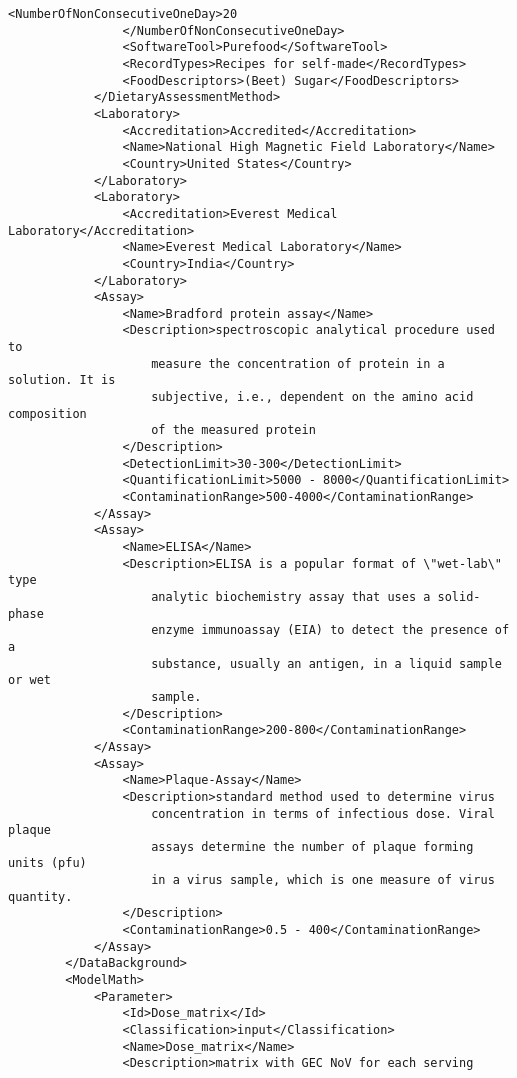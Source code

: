 \begin{lstlisting}[language=RAKIP, caption={Example of GenericModel}]
                <NumberOfNonConsecutiveOneDay>20
                </NumberOfNonConsecutiveOneDay>
                <SoftwareTool>Purefood</SoftwareTool>
                <RecordTypes>Recipes for self-made</RecordTypes>
                <FoodDescriptors>(Beet) Sugar</FoodDescriptors>
            </DietaryAssessmentMethod>
            <Laboratory>
                <Accreditation>Accredited</Accreditation>
                <Name>National High Magnetic Field Laboratory</Name>
                <Country>United States</Country>
            </Laboratory>
            <Laboratory>
                <Accreditation>Everest Medical Laboratory</Accreditation>
                <Name>Everest Medical Laboratory</Name>
                <Country>India</Country>
            </Laboratory>
            <Assay>
                <Name>Bradford protein assay</Name>
                <Description>spectroscopic analytical procedure used to
                    measure the concentration of protein in a solution. It is
                    subjective, i.e., dependent on the amino acid composition
                    of the measured protein
                </Description>
                <DetectionLimit>30-300</DetectionLimit>
                <QuantificationLimit>5000 - 8000</QuantificationLimit>
                <ContaminationRange>500-4000</ContaminationRange>
            </Assay>
            <Assay>
                <Name>ELISA</Name>
                <Description>ELISA is a popular format of \"wet-lab\" type
                    analytic biochemistry assay that uses a solid-phase
                    enzyme immunoassay (EIA) to detect the presence of a
                    substance, usually an antigen, in a liquid sample or wet
                    sample.
                </Description>
                <ContaminationRange>200-800</ContaminationRange>
            </Assay>
            <Assay>
                <Name>Plaque-Assay</Name>
                <Description>standard method used to determine virus
                    concentration in terms of infectious dose. Viral plaque
                    assays determine the number of plaque forming units (pfu)
                    in a virus sample, which is one measure of virus quantity.
                </Description>
                <ContaminationRange>0.5 - 400</ContaminationRange>
            </Assay>
        </DataBackground>
        <ModelMath>
            <Parameter>
                <Id>Dose_matrix</Id>
                <Classification>input</Classification>
                <Name>Dose_matrix</Name>
                <Description>matrix with GEC NoV for each serving

\end{lstlisting}
